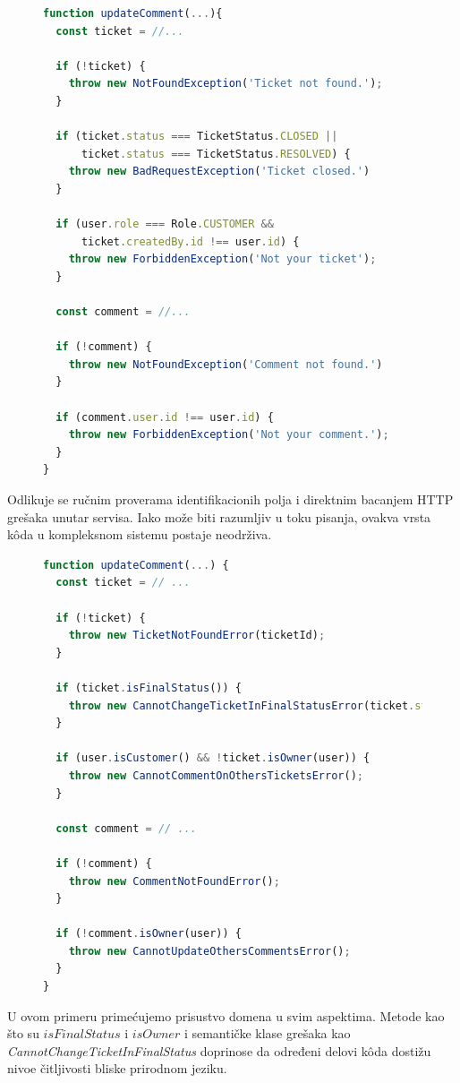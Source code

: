 \documentclass[12pt,oneside]{memoir}
\begin{document}
\begin{figure}[h]
\begin{lstlisting}[language=JavaScript, style=ES6, caption={Kod koji nije na domenskom jeziku}]
function updateComment(...){
  const ticket = //...
  
  if (!ticket) {
    throw new NotFoundException('Ticket not found.');
  }

  if (ticket.status === TicketStatus.CLOSED ||
      ticket.status === TicketStatus.RESOLVED) {
    throw new BadRequestException('Ticket closed.')
  }

  if (user.role === Role.CUSTOMER &&
      ticket.createdBy.id !== user.id) {
    throw new ForbiddenException('Not your ticket');
  }
  
  const comment = //...
  
  if (!comment) {
    throw new NotFoundException('Comment not found.')
  }
  
  if (comment.user.id !== user.id) {
    throw new ForbiddenException('Not your comment.');
  }
}
\end{lstlisting}
\end{figure}
\newpage
Odlikuje se ručnim proverama identifikacionih polja i direktnim bacanjem HTTP grešaka unutar servisa. Iako može biti razumljiv u toku pisanja, ovakva vrsta k\^{o}da u kompleksnom sistemu postaje neodrživa.

\begin{figure}[h]
\begin{lstlisting}[language=JavaScript, style=ES6, caption={K\^{o}d koji je na domenskom jeziku}]
function updateComment(...) {
  const ticket = // ...

  if (!ticket) {
    throw new TicketNotFoundError(ticketId);
  }

  if (ticket.isFinalStatus()) {
    throw new CannotChangeTicketInFinalStatusError(ticket.status);
  }

  if (user.isCustomer() && !ticket.isOwner(user)) {
    throw new CannotCommentOnOthersTicketsError();
  }

  const comment = // ...

  if (!comment) {
    throw new CommentNotFoundError();
  }

  if (!comment.isOwner(user)) {
    throw new CannotUpdateOthersCommentsError();
  }
}
\end{lstlisting}
\end{figure}

\newpage
U ovom primeru primećujemo prisustvo domena u svim aspektima. Metode kao što su $isFinalStatus$ i $isOwner$ i semantičke klase grešaka kao \textit{CannotChangeTicketInFinalStatus} doprinose da određeni delovi k\^{o}da dostižu nivoe čitljivosti bliske prirodnom jeziku.
\end{document}
